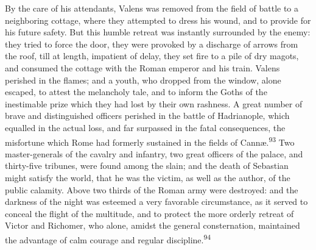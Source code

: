 By the care of his attendants, Valens was removed from the field
of battle to a neighboring cottage, where they attempted to dress
his wound, and to provide for his future safety. But this humble
retreat was instantly surrounded by the enemy: they tried to
force the door, they were provoked by a discharge of arrows from
the roof, till at length, impatient of delay, they set fire to a
pile of dry magots, and consumed the cottage with the Roman
emperor and his train. Valens perished in the flames; and a
youth, who dropped from the window, alone escaped, to attest the
melancholy tale, and to inform the Goths of the inestimable prize
which they had lost by their own rashness. A great number of
brave and distinguished officers perished in the battle of
Hadrianople, which equalled in the actual loss, and far surpassed
in the fatal consequences, the misfortune which Rome had formerly
sustained in the fields of Cannæ.\textsuperscript{93} Two master-generals of the
cavalry and infantry, two great officers of the palace, and
thirty-five tribunes, were found among the slain; and the death
of Sebastian might satisfy the world, that he was the victim, as
well as the author, of the public calamity. Above two thirds of
the Roman army were destroyed: and the darkness of the night was
esteemed a very favorable circumstance, as it served to conceal
the flight of the multitude, and to protect the more orderly
retreat of Victor and Richomer, who alone, amidst the general
consternation, maintained the advantage of calm courage and
regular discipline.\textsuperscript{94}




